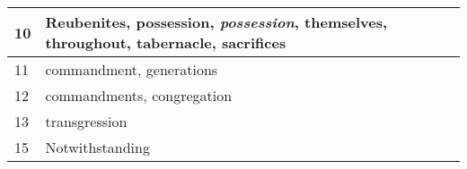 \begin{center}
\begin{longtable}{l|p{3.75in}}
10 & Reubenites, possession, \emph{possession}, themselves, throughout, tabernacle, sacrifices\\ \hline 
11 & commandment, generations\\ \hline 
12 & commandments, congregation\\ \hline 
13 & transgression\\ \hline 
15 & Notwithstanding\\ \hline 
\end{longtable}
\end{center}





